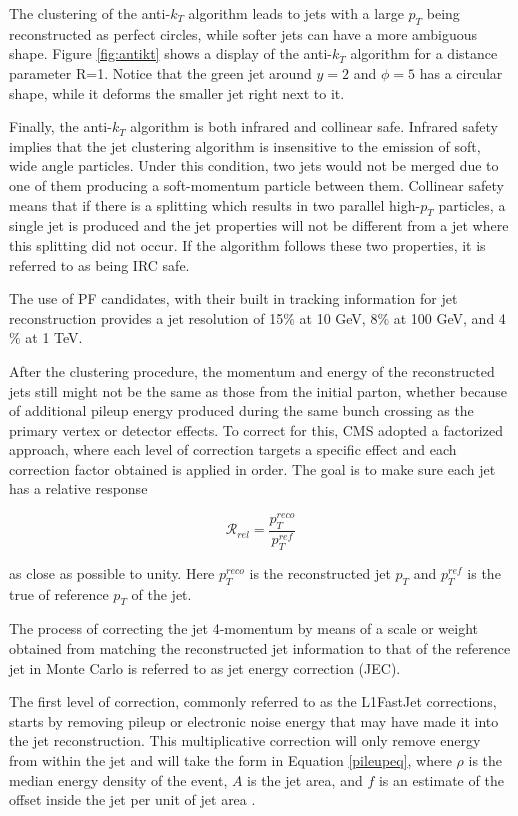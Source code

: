 The clustering of the anti-$k_{T}$ algorithm leads to jets with a large $p_{T}$ being reconstructed as perfect circles, while softer jets can have a more ambiguous shape. Figure \ref{fig:antikt} shows a display of the anti-$k_{T}$ algorithm for a distance parameter R=1. Notice that the green jet around $y=2$ and $\phi=5$ has a circular shape, while it deforms the smaller jet right next to it.

Finally, the anti-$k_{T}$ algorithm is both infrared and collinear safe. Infrared safety implies that the jet clustering algorithm is insensitive to the emission of soft, wide angle particles. Under this condition, two jets would not be merged due to one of them producing a soft-momentum particle between them. Collinear safety means that if there is a splitting which results in two parallel high-$p_{T}$ particles, a single jet is produced and the jet properties will not be different from a jet where this splitting did not occur. If the algorithm follows these two properties, it is referred to as being IRC safe.

The use of PF candidates, with their built in tracking information for jet reconstruction provides a jet resolution of 15$\%$ at 10 GeV, 8$\%$ at 100 GeV, and 4$\%$ at 1 TeV\cite{CMS-PAS-PFT-09-001}. 

After the clustering procedure, the momentum and energy of the reconstructed jets still might not be the same as those from the initial parton, whether because of additional pileup energy produced during the same bunch crossing as the primary vertex or detector effects. To correct for this, CMS adopted a factorized approach\cite{JINST2011}, where each level of correction targets a specific effect and each correction factor obtained is applied in order. The goal is to make sure each jet has a relative response

\begin{equation}
\mathcal{R}_{rel} = \frac{p_{T}^{reco}}{p_{T}^{ref}} 
\end{equation}

as close as possible to unity. Here $p_{T}^{reco}$ is the reconstructed jet $p_{T}$ and $p_{T}^{ref}$ is the true of reference $p_{T}$ of the jet. 

The process of correcting the jet 4-momentum by means of a scale or weight obtained from matching the reconstructed jet information to that of the reference jet in Monte Carlo is referred to as jet energy correction (JEC).

The first level of correction, commonly referred to as the L1FastJet\cite{Cacciari2007} corrections, starts by removing pileup or electronic noise energy that may have made it into the jet reconstruction. This multiplicative correction will only remove energy from within the jet and will take the form in Equation \ref{pileupeq}, where $\rho$ is the median energy density of the event, $A$ is the jet area, and $f$ is an estimate of the offset inside the jet per unit of jet area \cite{JINST2011,Cacciari2007}.

